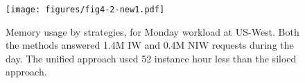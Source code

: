 \begin{figure}[t]
    \centering
\texttt{[image: figures/fig4-2-new1.pdf]}
    \caption{
    Memory usage by strategies, for Monday workload at US-West. Both the methods answered 1.4M IW and 0.4M NIW requests during the day. The unified approach used 52 instance hour less than the siloed approach.}
 
   \label{fig:motivation-utilization}
\end{figure}

